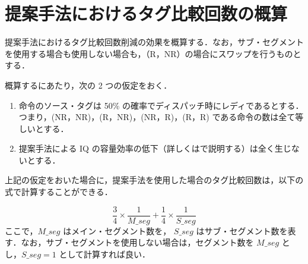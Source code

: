\section{提案手法におけるタグ比較回数の概算}
\label{sec:comp_estimate}
提案手法におけるタグ比較回数削減の効果を概算する．なお，サブ・セグメントを使用する場合も使用しない場合も，（R，NR）の場合にスワップを行うものとする．

概算するにあたり，次の 2 つの仮定をおく．
\begin{enumerate}
  \item 命令のソース・タグは 50\% の確率でディスパッチ時にレディであるとする．つまり，(NR，NR)，(R，NR)，(NR，R)，(R，R) である命令の数は全て等しいとする．
  \item 提案手法による IQ の容量効率の低下（詳しくはで説明する）は全く生じないとする．
\end{enumerate}
上記の仮定をおいた場合に，提案手法を使用した場合のタグ比較回数は，以下の式で計算することができる．

\[
  \frac{3}{4}\times\frac{1}{M\_seg} + \frac{1}{4}\times\frac{1}{S\_seg}
\]
ここで，$M\_seg$ はメイン・セグメント数を， $S\_seg$ はサブ・セグメント数を表す．なお，サブ・セグメントを使用しない場合は，セグメント数を $M\_seg$ とし，$S\_seg = 1 $ として計算すれば良い．





